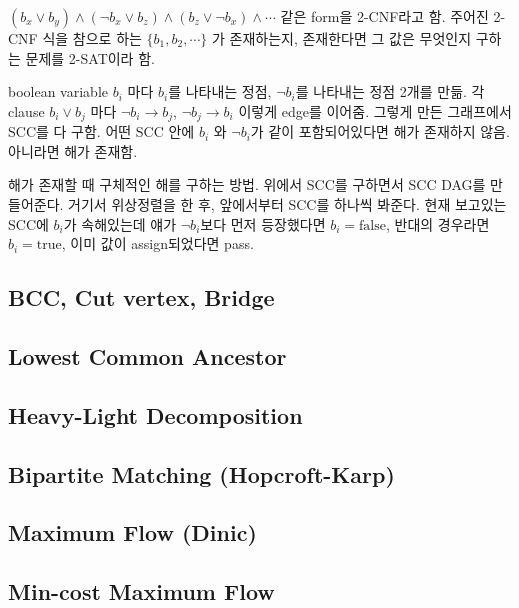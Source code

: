 \documentclass[10pt,landscape,a4paper,twocolumn]{article}
\begin{document}
$(b_{x} \lor b_{y}) \land (\neg b_{x} \lor b_{z}) \land (b_{z} \lor \neg b_{x}) \land \cdots$ 같은 form을 2-CNF라고 함. 주어진 2-CNF 식을 참으로 하는 $\{ b_1, b_2, \cdots \}$ 가 존재하는지, 존재한다면 그 값은 무엇인지 구하는 문제를 2-SAT이라 함.

boolean variable $b_{i}$ 마다 $b_{i}$를 나타내는 정점, $\neg b_{i} $를 나타내는 정점 2개를 만듦. 각 clause $b_{i} \lor b_{j}$ 마다 $\neg b_{i} \to b_{j}$, $\neg b_{j} \to b_{i}$ 이렇게 edge를 이어줌. 그렇게 만든 그래프에서 SCC를 다 구함. 어떤 SCC 안에 $b_{i}$ 와 $\neg b_{i}$가 같이 포함되어있다면 해가 존재하지 않음. 아니라면 해가 존재함.

해가 존재할 때 구체적인 해를 구하는 방법. 위에서 SCC를 구하면서 SCC DAG를 만들어준다. 거기서 위상정렬을 한 후, 앞에서부터 SCC를 하나씩 봐준다. 현재 보고있는 SCC에 $b_{i}$가 속해있는데 얘가 $\neg b_{i}$보다 먼저 등장했다면 $b_{i} = \mathrm{false}$, 반대의 경우라면 $b_{i} = \mathrm{true}$, 이미 값이 assign되었다면 pass.

\subsection{BCC, Cut vertex, Bridge}


\subsection{Lowest Common Ancestor}


\subsection{Heavy-Light Decomposition}


\subsection{Bipartite Matching (Hopcroft-Karp)}


\subsection{Maximum Flow (Dinic)}


\subsection{Min-cost Maximum Flow}

\end{document}
